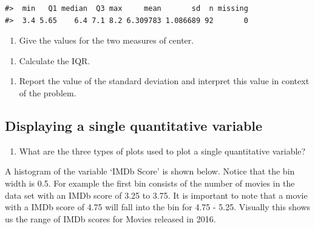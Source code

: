 \documentclass[
]{report}
\providecommand{\tightlist}{%
  \setlength{\itemsep}{0pt}\setlength{\parskip}{0pt}}
\begin{document}
\begin{verbatim}
#>  min   Q1 median  Q3 max     mean       sd  n missing
#>  3.4 5.65    6.4 7.1 8.2 6.309783 1.086689 92       0
\end{verbatim}

\begin{enumerate}
\def\labelenumi{\arabic{enumi}.}
\setcounter{enumi}{3}
\tightlist
\item
  Give the values for the two measures of center.
\end{enumerate}

\vspace{0.5in}

\begin{enumerate}
\def\labelenumi{\arabic{enumi}.}
\setcounter{enumi}{4}
\tightlist
\item
  Calculate the IQR.
\end{enumerate}

\vspace{0.5in}

\begin{enumerate}
\def\labelenumi{\arabic{enumi}.}
\setcounter{enumi}{5}
\tightlist
\item
  Report the value of the standard deviation and interpret this value in context of the problem.
  \vspace{1in}
\end{enumerate}

\hypertarget{displaying-a-single-quantitative-variable}{%
\subsection{Displaying a single quantitative variable}\label{displaying-a-single-quantitative-variable}}

\begin{enumerate}
\def\labelenumi{\arabic{enumi}.}
\setcounter{enumi}{6}
\tightlist
\item
  What are the three types of plots used to plot a single quantitative variable?
\end{enumerate}

\newpage

A histogram of the variable `IMDb Score' is shown below. Notice that the bin width is 0.5. For example the first bin consists of the number of movies in the data set with an IMDb score of 3.25 to 3.75. It is important to note that a movie with a IMDb score of 4.75 will fall into the bin for 4.75 - 5.25. Visually this shows us the range of IMDb scores for Movies released in 2016.
\end{document}
